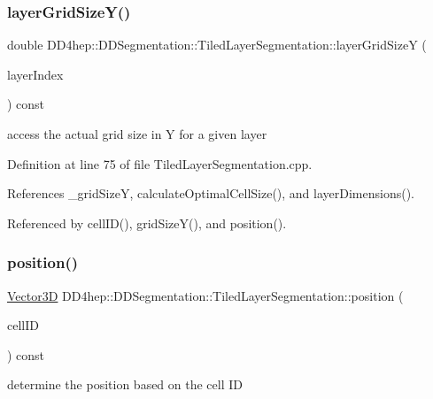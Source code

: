 \subsubsection{\texorpdfstring{layer\+Grid\+Size\+Y()}{layerGridSizeY()}}
{\footnotesize\ttfamily double D\+D4hep\+::\+D\+D\+Segmentation\+::\+Tiled\+Layer\+Segmentation\+::layer\+Grid\+SizeY (\begin{DoxyParamCaption}\item[{int}]{layer\+Index }\end{DoxyParamCaption}) const}



access the actual grid size in Y for a given layer 



Definition at line 75 of file Tiled\+Layer\+Segmentation.\+cpp.



References \+\_\+grid\+SizeY, calculate\+Optimal\+Cell\+Size(), and layer\+Dimensions().



Referenced by cell\+I\+D(), grid\+Size\+Y(), and position().

\hypertarget{class_d_d4hep_1_1_d_d_segmentation_1_1_tiled_layer_segmentation_acc4571d3ad2ac352f1cfb7fc45d1f2b7}{}\label{class_d_d4hep_1_1_d_d_segmentation_1_1_tiled_layer_segmentation_acc4571d3ad2ac352f1cfb7fc45d1f2b7} 
\subsubsection{\texorpdfstring{position()}{position()}}
{\footnotesize\ttfamily \hyperlink{struct_d_d4hep_1_1_d_d_segmentation_1_1_vector3_d}{Vector3D} D\+D4hep\+::\+D\+D\+Segmentation\+::\+Tiled\+Layer\+Segmentation\+::position (\begin{DoxyParamCaption}\item[{const \hyperlink{namespace_d_d4hep_1_1_d_d_segmentation_ac7af071d85cb48820914434a07e21ba1}{Cell\+ID} \&}]{cell\+ID }\end{DoxyParamCaption}) const\hspace{0.3cm}{\ttfamily [virtual]}}



determine the position based on the cell ID 



